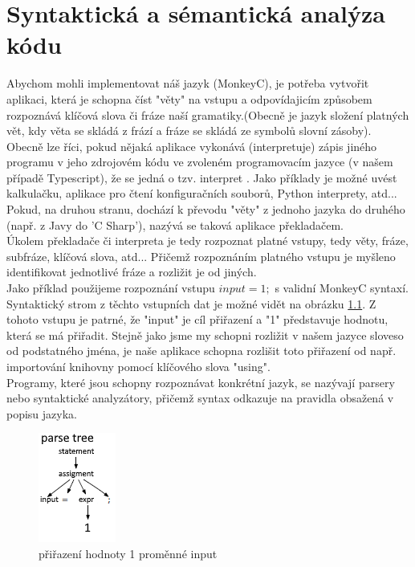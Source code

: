 \chapter{Syntaktická a sémantická analýza kódu} \label{4Chapter}
Abychom mohli implementovat náš jazyk (MonkeyC), je potřeba vytvořit aplikaci, která je schopna číst "věty" na vstupu a odpovídajicím způsobem rozpoznává klíčová slova či fráze naší gramatiky.(Obecně je jazyk složení platných vět, kdy věta se skládá z frází a fráze se skládá ze symbolů slovní zásoby).\\
Obecně lze říci, pokud nějaká aplikace vykonává (interpretuje) zápis jiného programu v jeho zdrojovém kódu ve zvoleném programovacím jazyce (v našem případě Typescript), že se jedná o tzv. interpret \cite{Interpret_2020}. Jako příklady je možné uvést kalkulačku, aplikace pro čtení konfiguračních souborů, Python interprety, atd... Pokud, na druhou stranu, dochází k převodu "věty" z jednoho jazyka do druhého (např. z Javy do 'C Sharp'), nazývá se taková aplikace překladačem.\\
Úkolem překladače či interpreta je tedy rozpoznat platné vstupy, tedy věty, fráze, subfráze, klíčová slova, atd... Přičemž rozpoznáním platného vstupu je myšleno identifikovat jednotlivé fráze a rozližit je od jiných.\\
Jako příklad použijeme rozpoznání vstupu $input = 1;$ s validní MonkeyC syntaxí. Syntaktický strom z těchto vstupních dat je možné vidět na obrázku \ref{img:assigment}. Z tohoto vstupu je patrné, že "input" je cíl přiřazení a "1" představuje hodnotu, která se má přiřadit. Stejně jako jsme my schopni rozližit v našem jazyce sloveso od podstatného jména, je naše aplikace schopna rozlišit toto přiřazení od např. importování knihovny pomocí klíčového slova "using".\\
Programy, které jsou schopny rozpoznávat konkrétní jazyk, se nazývají parsery nebo syntaktické analyzátory, přičemž syntax odkazuje na pravidla obsažená v popisu jazyka.\\

\begin{figure}[b!]
	\centering
	\includegraphics[scale=1.5]{images/assigment}
	 \caption{přiřazení hodnoty 1 proměnné input}
	 \label{img:assigment}
\end{figure}


